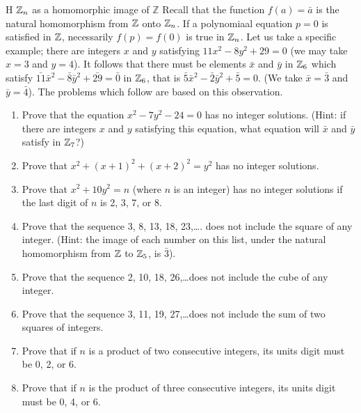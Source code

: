 \begin{exercise}{H $\mathbb{Z}_{n}$ as a homomorphic image of $\mathbb{Z}$}
Recall that the function $f(a)=\bar{a}$ is the natural homomorphism from $\mathbb{Z}$ onto $\mathbb{Z}_{n}$. If a polynomiaal equation $p=0$ is satisfied in $\mathbb{Z}$, necessarily $f(p)=f(0)$ is true in $\mathbb{Z}_{n}$. Let us take a specific example; there are integers $x$ and $y$ satisfying $11x^{2}-8y^{2}+29=0$ (we may take $x=3$ and $y=4$). It follows that there must be elements $\bar{x}$ and $\bar{y}$ in $\mathbb{Z}_{6}$ which satisfy $\bar{11}\bar{x}^{2}-\bar{8}\bar{y}^{2}+\bar{29}=\bar{0}$ in $\mathbb{Z}_{6}$, that is $\bar{5}\bar{x}^{2}-\bar{2}\bar{y}^{2}+\bar{5}=0$. (We take $\bar{x}=\bar{3}$ and $\bar{y}=\bar{4}$). The problems which follow are based on this observation.
  \begin{enumerate}
      \item Prove that the equation $x^{2}-7y^{2}-24=0$ has no integer solutions. (Hint: if there are integers $x$ and $y$ satisfying this equation, what equation will $\bar{x}$ and $\bar{y}$ satisfy in $\mathbb{Z}_{7}$?)
      \item Prove that $x^{2}+(x+1)^{2}+(x+2)^{2}=y^{2}$ has no integer solutions.
      \item Prove that $x^{2}+10y^{2}=n$ (where $n$ is an integer) has no integer solutions if the last digit of $n$ is 2, 3, 7, or 8.
      \item Prove that the sequence 3, 8, 13, 18, 23,\dots. does not include the square of any integer. (Hint: the image of each number on this list, under the natural homomorphism from $\mathbb{Z}$ to $\mathbb{Z}_{5}$, is $\bar{3}$).
      \item Prove that the sequence 2, 10, 18, 26,\dots does not include the cube of any integer.
      \item Prove that the sequence 3, 11, 19, 27,\dots does not include the sum of two squares of integers.
      \item Prove that if $n$ is a product of two consecutive integers, its units digit must be 0, 2, or 6.
      \item Prove that if $n$ is the product of three consecutive integers, its units digit must be 0, 4, or 6.
  \end{enumerate}
\end{exercise}
